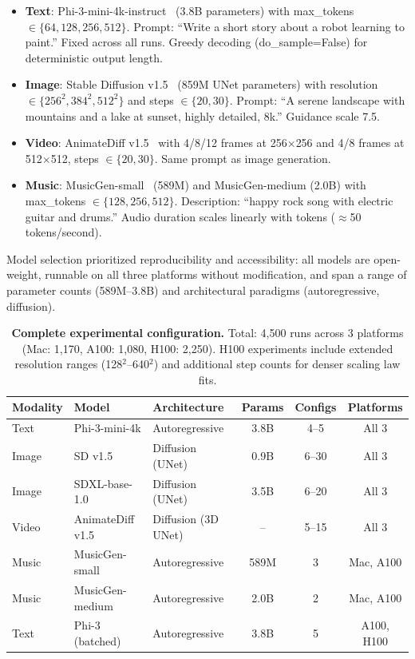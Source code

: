 \documentclass[preprint,12pt]{elsarticle}
\begin{document}
\begin{itemize}[leftmargin=*]
\item \textbf{Text}: Phi-3-mini-4k-instruct~\cite{abdin2024phi3} (3.8B parameters) with max\_tokens $\in \{64, 128, 256, 512\}$. Prompt: ``Write a short story about a robot learning to paint.'' Fixed across all runs. Greedy decoding (do\_sample=False) for deterministic output length.
\item \textbf{Image}: Stable Diffusion v1.5~\cite{rombach2022high} (859M UNet parameters) with resolution $\in \{256^2, 384^2, 512^2\}$ and steps $\in \{20, 30\}$. Prompt: ``A serene landscape with mountains and a lake at sunset, highly detailed, 8k.'' Guidance scale 7.5.
\item \textbf{Video}: AnimateDiff v1.5~\cite{guo2024animatediff} with 4/8/12 frames at 256$\times$256 and 4/8 frames at 512$\times$512, steps $\in \{20, 30\}$. Same prompt as image generation.
\item \textbf{Music}: MusicGen-small~\cite{copet2024musicgen} (589M) and MusicGen-medium (2.0B) with max\_tokens $\in \{128, 256, 512\}$. Description: ``happy rock song with electric guitar and drums.'' Audio duration scales linearly with tokens ($\approx$50 tokens/second).
\end{itemize}

Model selection prioritized reproducibility and accessibility: all models are open-weight, runnable on all three platforms without modification, and span a range of parameter counts (589M--3.8B) and architectural paradigms (autoregressive, diffusion).

\begin{table}[t]
\centering
\caption{\textbf{Complete experimental configuration.} Total: 4,500 runs across 3 platforms (Mac: 1,170, A100: 1,080, H100: 2,250). H100 experiments include extended resolution ranges (128$^2$--640$^2$) and additional step counts for denser scaling law fits.}
\label{tab:models_detail}
\small
\begin{tabular}{@{}lllccc@{}}
\toprule
\textbf{Modality} & \textbf{Model} & \textbf{Architecture} & \textbf{Params} & \textbf{Configs} & \textbf{Platforms} \\
\midrule
Text & Phi-3-mini-4k & Autoregressive & 3.8B & 4--5 & All 3 \\
Image & SD v1.5 & Diffusion (UNet) & 0.9B & 6--30 & All 3 \\
Image & SDXL-base-1.0 & Diffusion (UNet) & 3.5B & 6--20 & All 3 \\
Video & AnimateDiff v1.5 & Diffusion (3D UNet) & -- & 5--15 & All 3 \\
Music & MusicGen-small & Autoregressive & 589M & 3 & Mac, A100 \\
Music & MusicGen-medium & Autoregressive & 2.0B & 2 & Mac, A100 \\
Text & Phi-3 (batched) & Autoregressive & 3.8B & 5 & A100, H100 \\
\bottomrule
\end{tabular}
\end{table}
\end{document}
